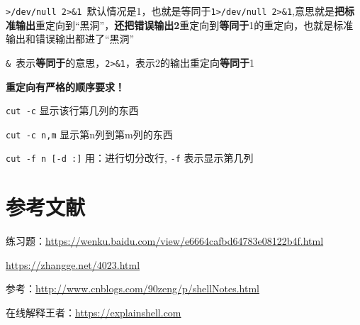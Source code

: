 \documentclass[UTF8,a4paper,12pt]{ctexbook}
\begin{document}
			\verb|>/dev/null 2>&1 |默认情况是1，也就是等同于\verb|1>/dev/null 2>&1|,意思就是\textbf{把标准输出}重定向到“黑洞”，\textbf{还把错误输出2}重定向到\textbf{等同于}1的重定向，也就是标准输出和错误输出都进了“黑洞”
			
			\verb|& |表示\textbf{等同于}的意思，\verb|2>&1|，表示2的输出重定向\textbf{等同于}1
			
			\textbf{重定向有严格的顺序要求！}
			
			\verb|cut -c| 显示该行第几列的东西
			
			\verb|cut -c n,m| 显示第n列到第m列的东西
			
			\verb|cut -f n [-d :]| 用：进行切分改行, \verb|-f| 表示显示第几列

		\subparagraph{}
		
		\subparagraph{}	
		
		\subparagraph{}
		
		\subparagraph{}
				
		\subparagraph{}
		
		\subparagraph{}	
		
		\subparagraph{}
		
		
\chapter{参考文献}
	
		 练习题：\url{https://wenku.baidu.com/view/e6664cafbd64783e08122b4f.html}
		 
			 \url{https://zhangge.net/4023.html}
			 
			 参考：\url{http://www.cnblogs.com/90zeng/p/shellNotes.html}
			 
		在线解释王者：\url{https://explainshell.com}	    
\end{document}
